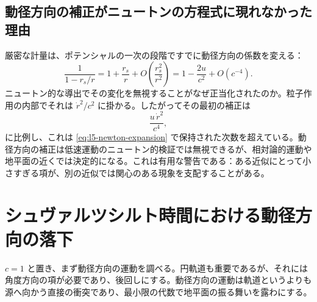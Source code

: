 \begin{classroomqa}
\end{classroomqa}

\subsection{動径方向の補正がニュートンの方程式に現れなかった理由}

厳密な計量は、ポテンシャルの一次の段階ですでに動径方向の係数を変える：
\begin{equation}
\frac{1}{1-r_s/r}
=1+\frac{r_s}{r}
+O\!\left(\frac{r_s^2}{r^2}\right)
=1-\frac{2u}{c^2}+O(c^{-4}).
\label{eq:l5-radial-expansion}
\end{equation}
ニュートン的な導出でその変化を無視することがなぜ正当化されたのか。粒子作用の内部でそれは \(\dot r^2/c^2\) に掛かる。したがってその最初の補正は
\begin{equation}
\frac{u\,\dot r^2}{c^4},
\end{equation}
に比例し、これは
\eqref{eq:l5-newton-expansion}
で保持された次数を超えている。動径方向の補正は低速運動のニュートン的検証では無視できるが、相対論的運動や地平面の近くでは決定的になる。これは有用な警告である：ある近似にとって小さすぎる項が、別の近似では関心のある現象を支配することがある。

\section{シュヴァルツシルト時間における動径方向の落下}

\(c=1\) と置き、まず動径方向の運動を調べる。円軌道も重要であるが、それには角度方向の項が必要であり、後回しにする。動径方向の運動は軌道というよりも源へ向かう直接の衝突であり、最小限の代数で地平面の振る舞いを露わにする。

\begin{classroomqa}
\end{classroomqa}

